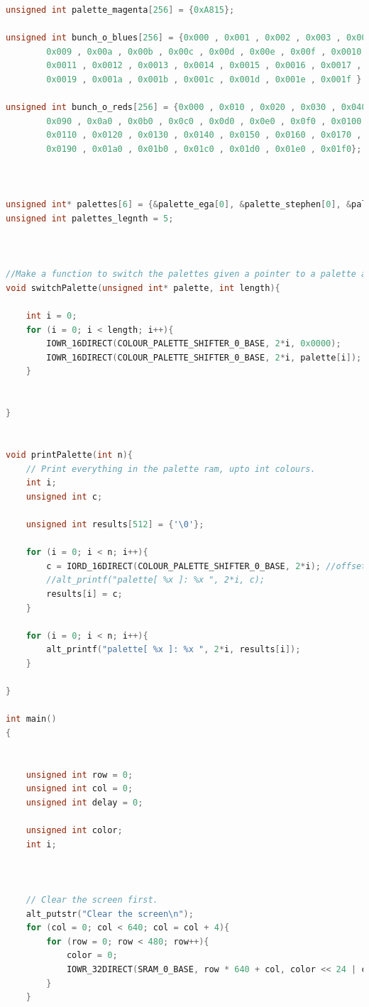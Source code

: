 \documentclass{capstonedoc}
\begin{document}
\begin{lstlisting}[language=c,caption={Sample Program that Generates a Test Pattern, then changes the color},label={lst:testcode},tabsize=2]
unsigned int palette_magenta[256] = {0xA815};

unsigned int bunch_o_blues[256] = {0x000 , 0x001 , 0x002 , 0x003 , 0x004 , 0x005 , 0x006 , 0x007 , 0x008 ,
		0x009 , 0x00a , 0x00b , 0x00c , 0x00d , 0x00e , 0x00f , 0x0010 ,
		0x0011 , 0x0012 , 0x0013 , 0x0014 , 0x0015 , 0x0016 , 0x0017 , 0x0018 ,
		0x0019 , 0x001a , 0x001b , 0x001c , 0x001d , 0x001e , 0x001f };

unsigned int bunch_o_reds[256] = {0x000 , 0x010 , 0x020 , 0x030 , 0x040 , 0x050 , 0x060 , 0x070 , 0x080 ,
		0x090 , 0x0a0 , 0x0b0 , 0x0c0 , 0x0d0 , 0x0e0 , 0x0f0 , 0x0100 ,
		0x0110 , 0x0120 , 0x0130 , 0x0140 , 0x0150 , 0x0160 , 0x0170 , 0x0180 ,
		0x0190 , 0x01a0 , 0x01b0 , 0x01c0 , 0x01d0 , 0x01e0 , 0x01f0};



unsigned int* palettes[6] = {&palette_ega[0], &palette_stephen[0], &palette_magenta[0], &bunch_o_blues[0], &bunch_o_reds[0]};
unsigned int palettes_legnth = 5;



//Make a function to switch the palettes given a pointer to a palette array.
void switchPalette(unsigned int* palette, int length){

	int i = 0;
	for (i = 0; i < length; i++){
		IOWR_16DIRECT(COLOUR_PALETTE_SHIFTER_0_BASE, 2*i, 0x0000);
		IOWR_16DIRECT(COLOUR_PALETTE_SHIFTER_0_BASE, 2*i, palette[i]);
	}


}


void printPalette(int n){
	// Print everything in the palette ram, upto int colours.
	int i;
	unsigned int c;

	unsigned int results[512] = {'\0'};

	for (i = 0; i < n; i++){
		c = IORD_16DIRECT(COLOUR_PALETTE_SHIFTER_0_BASE, 2*i); //offset multiplied by 2 to be on 16-bit boundaries.
		//alt_printf("palette[ %x ]: %x ", 2*i, c);
		results[i] = c;
	}

	for (i = 0; i < n; i++){
		alt_printf("palette[ %x ]: %x ", 2*i, results[i]);
	}

}

int main()
{


	unsigned int row = 0;
	unsigned int col = 0;
	unsigned int delay = 0;

	unsigned int color;
	int i;



	// Clear the screen first.
	alt_putstr("Clear the screen\n");
	for (col = 0; col < 640; col = col + 4){
		for (row = 0; row < 480; row++){
			color = 0;
			IOWR_32DIRECT(SRAM_0_BASE, row * 640 + col, color << 24 | color << 16 | color << 8 | color << 0);
		}
	}



\end{lstlisting}
\end{document}
